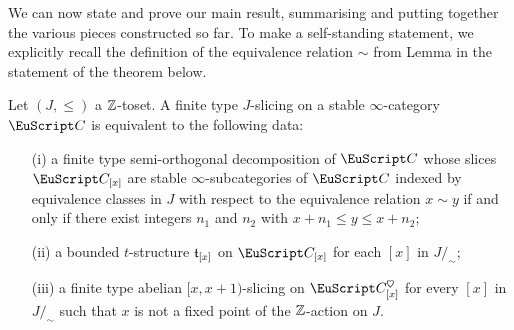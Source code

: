 We can now state and prove our main result, summarising and putting together the various pieces constructed so far. To make a self-standing statement, we explicitly recall the definition of the equivalence relation $\sim$ from Lemma  in the statement of the theorem below.
\begin{theorem}\label{conclusion}
Let $(J,\leq)$ a $\mathbb{Z}$-toset. A finite type $J$-slicing on a stable $\infty$-category $\C$ is equivalent to the following data:
\begin{enumerate}
\item[(i)] a finite type semi-orthogonal decomposition of $\C$ whose slices $\C_{[x]}$ are stable  $\infty$-subcategories of $\C$ indexed by equivalence classes in $J$ with respect to the equivalence relation $x\sim y$ if and only if there exist integers $n_1$ and $n_2$ with $x+n_1\leq y\leq x+n_2$;
\item[(ii)] a bounded $t$-structure $\mathfrak{t}_{[x]}$ on $\C_{[x]}$ for each  $[x]$ in $J/_{\!\sim}$;
\item[(iii)] a finite type abelian $[x,x+1)$-slicing on $\C_{[x]}^\heart$ for every $[x]$ in $J/_{\!\sim}$ such that $x$ is not a fixed point of the $\mathbb{Z}$-action on $J$.
\end{enumerate}
\end{theorem}

